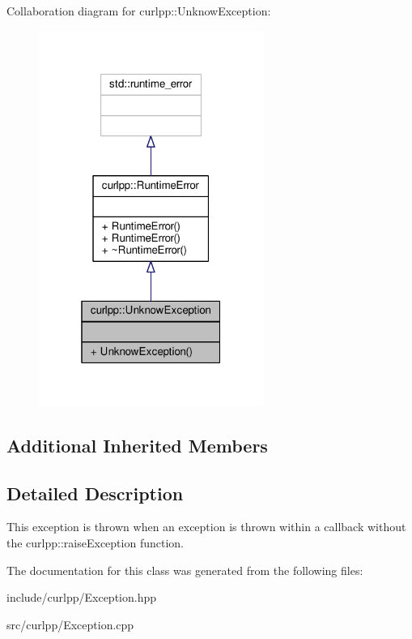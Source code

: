 Collaboration diagram for curlpp\-:\-:Unknow\-Exception\-:\nopagebreak
\begin{figure}[H]
\begin{center}
\leavevmode
\includegraphics[width=208pt]{classcurlpp_1_1UnknowException__coll__graph}
\end{center}
\end{figure}
\subsection*{Additional Inherited Members}


\subsection{Detailed Description}
This exception is thrown when an exception is thrown within a callback without the curlpp\-::raise\-Exception function. 

The documentation for this class was generated from the following files\-:\begin{DoxyCompactItemize}
\item 
include/curlpp/Exception.\-hpp\item 
src/curlpp/Exception.\-cpp\end{DoxyCompactItemize}
